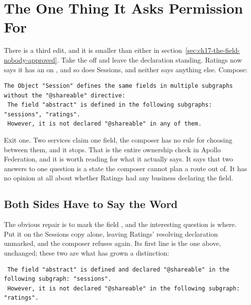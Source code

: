 \section{The One Thing It Asks Permission For}
\label{sec:ch17-the-one-thing-it-asks-permission-for}

%
There is a third edit, and it is smaller than either in
section~\ref{sec:ch17-the-field-nobody-approved}. Take the
 off and leave the declaration standing.
Ratings now says it has an  on , and so does
Sessions, and neither says anything else. Compose:

\begin{verbatim}
The Object "Session" defines the same fields in multiple subgraphs without the "@shareable" directive:
 The field "abstract" is defined in the following subgraphs: "sessions", "ratings".
 However, it is not declared "@shareable" in any of them.
\end{verbatim}

%
Exit one. Two services claim one field, the composer has no rule for choosing
between them, and it stops. That is the entire ownership check in Apollo
Federation, and it is worth reading for what it actually says. It says that
two answers to one question is a state the composer cannot plan a route out
of. It has no opinion at all about whether Ratings had any business declaring
the field.

\subsection{Both Sides Have to Say the Word}

%
The obvious repair is to mark the field , and the interesting
question is where. Put it on the Sessions copy alone, leaving Ratings'
resolving declaration unmarked, and the composer refuses again. Its first line is the one above, unchanged; these two are what has
grown a distinction:

\begin{verbatim}
 The field "abstract" is defined and declared "@shareable" in the following subgraph: "sessions".
 However, it is not declared "@shareable" in the following subgraph: "ratings".
\end{verbatim}

